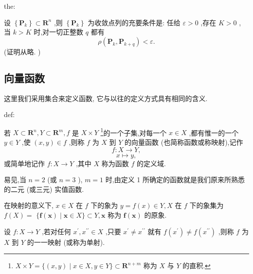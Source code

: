 \begin{theorem}{}{the:}

\end{theorem}
 设 \(\left\{  {\mathbf{P}}_{k}\right\}   \subset  {\mathbf{R}}^{n}\) ,则 \(\left\{  {\mathbf{P}}_{k}\right\}\) 为收敛点列的充要条件是: 任给 \(\varepsilon  > 0\) ,存在 \(K > 0\) , 当 \(k > K\) 时,对一切正整数 \(q\) 都有
\[
\rho \left( {{\mathbf{P}}_{k},{\mathbf{P}}_{k + q}}\right)  < \varepsilon . \tag{5}
\]
(证明从略. )

\subsection{向量函数}

这里我们采用集合来定义函数, 它与以往的定义方式具有相同的含义.

\begin{definition}{}{def:}

\end{definition}
若 \(X \subset  {\mathbf{R}}^{n},Y \subset  {\mathbf{R}}^{m},f\) 是 \(X \times  {Y}\) \footnote{\(X \times  Y = \{ \left( {x,y}\right)  \mid  x \in  X,y \in  Y\}  \subset  {\mathbf{R}}^{n + m}\) 称为 \(X\) 与 \(Y\) 的直积.}的一个子集,对每一个 \(x \in  X\) ,都有惟一的一个 \(y \in  Y\) ,使 \(\left( {x,y}\right)  \in  f\) ,则称 \(f\) 为 \(X\) 到 \(Y\) 的向量函数 (也简称函数或称映射),记作
\[
f : X \rightarrow  Y,
\]
\[
x \mapsto  y,
\]
或简单地记作 \(f : X \rightarrow  Y\) ,其中 \(X\) 称为函数 \(f\) 的定义域.

易见,当 \(n = 2\) (或 \(n = 3\) ), \(m = 1\) 时,由定义 1 所确定的函数就是我们原来所熟悉的二元 (或三元) 实值函数.

在映射的意义下, \(x \in  X\) 在 \(f\) 下的象为 \(y = f\left( x\right)  \in  Y,X\) 在 \(f\) 下的象集为 \(f\left( X\right)  =\)  \(\{ \mathbf{f}\left( \mathbf{x}\right)  \mid  \mathbf{x} \in  X\}  \subset  Y,\mathbf{x}\) 称为 \(\mathbf{f}\left( \mathbf{x}\right)\) 的原象.

设 \(f : X \rightarrow  Y\) ,若对任何 \({x}^{\prime },{x}^{\prime \prime } \in  X\) ,只要 \({x}^{\prime } \neq  {x}^{\prime \prime }\) 就有 \(f\left( {x}^{\prime }\right)  \neq  f\left( {x}^{\prime \prime }\right)\) ,则称 \(f\) 为 \(X\) 到 \(Y\) 的一一映射 (或称为单射).

